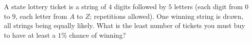 A state lottery ticket is a string of $4$ digits followed by $5$ letters (each digit from $0$ to $9$, each letter from $A$ to $Z$; repetitions allowed). One winning string is drawn, all strings being equally likely. What is the least number of tickets you must buy to have at least a $1\%$ chance of winning?
